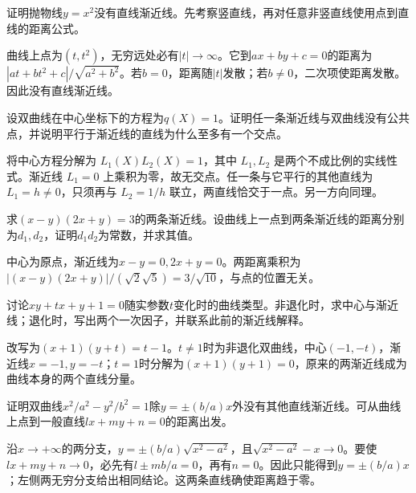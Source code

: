 证明抛物线\(y=x^2\)没有直线渐近线。先考察竖直线，再对任意非竖直线使用点到直线的距离公式。
\par
\solutionanswer
曲线上点为\((t,t^2)\)，无穷远处必有\(|t|\to\infty\)。它到\(ax+by+c=0\)的距离为\(|at+bt^2+c|/\sqrt{a^2+b^2}\)。若\(b=0\)，距离随\(|t|\)发散；若\(b\ne0\)，二次项使距离发散。因此没有直线渐近线。


设双曲线在中心坐标下的方程为\(q(X)=1\)。证明任一条渐近线与双曲线没有公共点，并说明平行于渐近线的直线为什么至多有一个交点。
\par
\solutionanswer
将中心方程分解为 \(L_1(X)L_2(X)=1\)，其中 \(L_1,L_2\) 是两个不成比例的实线性式。渐近线 \(L_1=0\) 上乘积为零，故无交点。任一条与它平行的其他直线为 \(L_1=h\ne0\)，只须再与 \(L_2=1/h\) 联立，两直线恰交于一点。另一方向同理。


求\((x-y)(2x+y)=3\)的两条渐近线。设曲线上一点到两条渐近线的距离分别为\(d_1,d_2\)，证明\(d_1d_2\)为常数，并求其值。
\par
\solutionanswer
中心为原点，渐近线为\(x-y=0,2x+y=0\)。两距离乘积为\(|(x-y)(2x+y)|/(\sqrt2\sqrt5)=3/\sqrt{10}\)，与点的位置无关。


讨论\(xy+tx+y+1=0\)随实参数\(t\)变化时的曲线类型。非退化时，求中心与渐近线；退化时，写出两个一次因子，并联系此前的渐近线解释。
\par
\solutionanswer
改写为\((x+1)(y+t)=t-1\)。\(t\ne1\)时为非退化双曲线，中心\((-1,-t)\)，渐近线\(x=-1,y=-t\)；\(t=1\)时分解为\((x+1)(y+1)=0\)，原来的两渐近线成为曲线本身的两个直线分量。


证明双曲线\(x^2/a^2-y^2/b^2=1\)除\(y=\pm(b/a)x\)外没有其他直线渐近线。可从曲线上点到一般直线\(lx+my+n=0\)的距离出发。
\par
\solutionanswer
沿\(x\to+\infty\)的两分支，\(y=\pm(b/a)\sqrt{x^2-a^2}\)，且\(\sqrt{x^2-a^2}-x\to0\)。要使\(lx+my+n\to0\)，必先有\(l\pm mb/a=0\)，再有\(n=0\)。因此只能得到\(y=\pm(b/a)x\)；左侧两无穷分支给出相同结论。这两条直线确使距离趋于零。
\par
